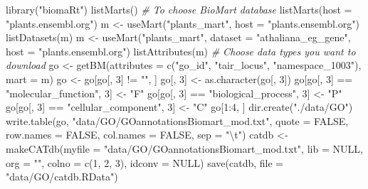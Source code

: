 \documentclass[14pt,]{article}
\newcommand{\hlnum}[1]{\textcolor[rgb]{0.816,0.125,0.439}{#1}}%
\newcommand{\hlstr}[1]{\textcolor[rgb]{0.251,0.627,0.251}{#1}}%
\newcommand{\hlcom}[1]{\textcolor[rgb]{0.502,0.502,0.502}{\textit{#1}}}%
\newcommand{\hlstd}[1]{\textcolor[rgb]{0.251,0.251,0.251}{#1}}%
\newenvironment{Shaded}{\begin{myshaded}}{\end{myshaded}}
\newcommand{\DecValTok}[1]{\hlnum{#1}}
\newcommand{\ConstantTok}[1]{\hlnum{#1}}
\newcommand{\SpecialCharTok}[1]{\hlstr{#1}}
\newcommand{\StringTok}[1]{\hlstr{#1}}
\newcommand{\CommentTok}[1]{\hlcom{#1}}
\newcommand{\OtherTok}[1]{{#1}}
\newcommand{\FunctionTok}[1]{\hlstd{#1}}
\newcommand{\AttributeTok}[1]{{#1}}
\newcommand{\NormalTok}[1]{\hlstd{#1}}
\begin{document}
\begin{Shaded}
\begin{Highlighting}[]
\FunctionTok{library}\NormalTok{(}\StringTok{"biomaRt"}\NormalTok{)}
\FunctionTok{listMarts}\NormalTok{()  }\CommentTok{\# To choose BioMart database}
\FunctionTok{listMarts}\NormalTok{(}\AttributeTok{host =} \StringTok{"plants.ensembl.org"}\NormalTok{)}
\NormalTok{m }\OtherTok{\textless{}{-}} \FunctionTok{useMart}\NormalTok{(}\StringTok{"plants\_mart"}\NormalTok{, }\AttributeTok{host =} \StringTok{"plants.ensembl.org"}\NormalTok{)}
\FunctionTok{listDatasets}\NormalTok{(m)}
\NormalTok{m }\OtherTok{\textless{}{-}} \FunctionTok{useMart}\NormalTok{(}\StringTok{"plants\_mart"}\NormalTok{, }\AttributeTok{dataset =} \StringTok{"athaliana\_eg\_gene"}\NormalTok{, }\AttributeTok{host =} \StringTok{"plants.ensembl.org"}\NormalTok{)}
\FunctionTok{listAttributes}\NormalTok{(m)  }\CommentTok{\# Choose data types you want to download}
\NormalTok{go }\OtherTok{\textless{}{-}} \FunctionTok{getBM}\NormalTok{(}\AttributeTok{attributes =} \FunctionTok{c}\NormalTok{(}\StringTok{"go\_id"}\NormalTok{, }\StringTok{"tair\_locus"}\NormalTok{, }\StringTok{"namespace\_1003"}\NormalTok{), }\AttributeTok{mart =}\NormalTok{ m)}
\NormalTok{go }\OtherTok{\textless{}{-}}\NormalTok{ go[go[, }\DecValTok{3}\NormalTok{] }\SpecialCharTok{!=} \StringTok{""}\NormalTok{, ]}
\NormalTok{go[, }\DecValTok{3}\NormalTok{] }\OtherTok{\textless{}{-}} \FunctionTok{as.character}\NormalTok{(go[, }\DecValTok{3}\NormalTok{])}
\NormalTok{go[go[, }\DecValTok{3}\NormalTok{] }\SpecialCharTok{==} \StringTok{"molecular\_function"}\NormalTok{, }\DecValTok{3}\NormalTok{] }\OtherTok{\textless{}{-}} \StringTok{"F"}
\NormalTok{go[go[, }\DecValTok{3}\NormalTok{] }\SpecialCharTok{==} \StringTok{"biological\_process"}\NormalTok{, }\DecValTok{3}\NormalTok{] }\OtherTok{\textless{}{-}} \StringTok{"P"}
\NormalTok{go[go[, }\DecValTok{3}\NormalTok{] }\SpecialCharTok{==} \StringTok{"cellular\_component"}\NormalTok{, }\DecValTok{3}\NormalTok{] }\OtherTok{\textless{}{-}} \StringTok{"C"}
\NormalTok{go[}\DecValTok{1}\SpecialCharTok{:}\DecValTok{4}\NormalTok{, ]}
\FunctionTok{dir.create}\NormalTok{(}\StringTok{"./data/GO"}\NormalTok{)}
\FunctionTok{write.table}\NormalTok{(go, }\StringTok{"data/GO/GOannotationsBiomart\_mod.txt"}\NormalTok{, }\AttributeTok{quote =} \ConstantTok{FALSE}\NormalTok{, }\AttributeTok{row.names =} \ConstantTok{FALSE}\NormalTok{, }
    \AttributeTok{col.names =} \ConstantTok{FALSE}\NormalTok{, }\AttributeTok{sep =} \StringTok{"}\SpecialCharTok{\textbackslash{}t}\StringTok{"}\NormalTok{)}
\NormalTok{catdb }\OtherTok{\textless{}{-}} \FunctionTok{makeCATdb}\NormalTok{(}\AttributeTok{myfile =} \StringTok{"data/GO/GOannotationsBiomart\_mod.txt"}\NormalTok{, }\AttributeTok{lib =} \ConstantTok{NULL}\NormalTok{, }\AttributeTok{org =} \StringTok{""}\NormalTok{, }
    \AttributeTok{colno =} \FunctionTok{c}\NormalTok{(}\DecValTok{1}\NormalTok{, }\DecValTok{2}\NormalTok{, }\DecValTok{3}\NormalTok{), }\AttributeTok{idconv =} \ConstantTok{NULL}\NormalTok{)}
\FunctionTok{save}\NormalTok{(catdb, }\AttributeTok{file =} \StringTok{"data/GO/catdb.RData"}\NormalTok{)}
\end{Highlighting}
\end{Shaded}
\end{document}
